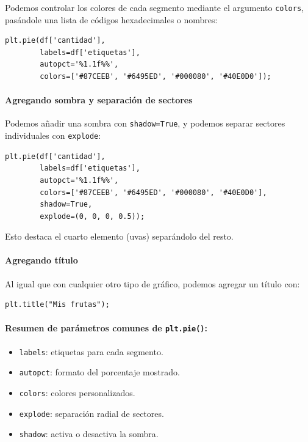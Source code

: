 \documentclass{article}
\theoremstyle{nonumberplain}
\begin{document}
Podemos controlar los colores de cada segmento mediante el argumento \texttt{colors}, pasándole una lista de códigos hexadecimales o nombres:

\begin{verbatim}
plt.pie(df['cantidad'],
        labels=df['etiquetas'],
        autopct='%1.1f%%',
        colors=['#87CEEB', '#6495ED', '#000080', '#40E0D0']);
\end{verbatim}

\paragraph{Agregando sombra y separación de sectores}

Podemos añadir una sombra con \texttt{shadow=True}, y podemos separar sectores individuales con \texttt{explode}:

\begin{verbatim}
plt.pie(df['cantidad'],
        labels=df['etiquetas'],
        autopct='%1.1f%%',
        colors=['#87CEEB', '#6495ED', '#000080', '#40E0D0'],
        shadow=True,
        explode=(0, 0, 0, 0.5));
\end{verbatim}

Esto destaca el cuarto elemento (uvas) separándolo del resto.

\paragraph{Agregando título}

Al igual que con cualquier otro tipo de gráfico, podemos agregar un título con:

\begin{verbatim}
plt.title("Mis frutas");
\end{verbatim}

\paragraph{Resumen de parámetros comunes de \texttt{plt.pie()}:}
\begin{itemize}
  \item \texttt{labels}: etiquetas para cada segmento.
  \item \texttt{autopct}: formato del porcentaje mostrado.
  \item \texttt{colors}: colores personalizados.
  \item \texttt{explode}: separación radial de sectores.
  \item \texttt{shadow}: activa o desactiva la sombra.
\end{itemize}
\end{document}

